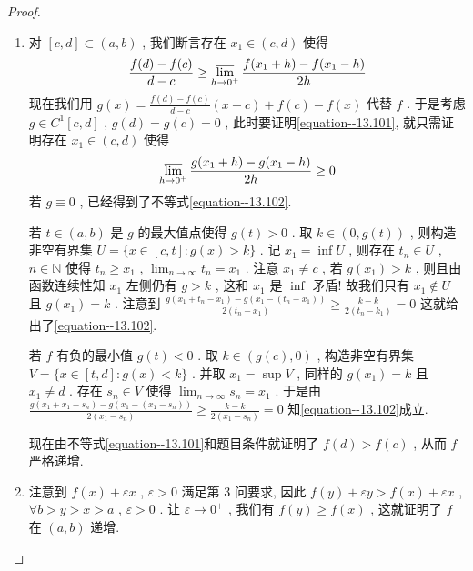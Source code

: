 \documentclass[../../main.tex]{subfiles}
\begin{document}
\begin{proof}
\begin{enumerate}
\item 对 \([c, d] \subset (a, b)\) , 我们断言存在 \(x_1 \in (c, d)\) 使得
\begin{align}
\frac{f(d) - f(c)}{d - c} \geq \varlimsup_{h \to 0^+} \frac{f(x_1 + h) - f(x_1 - h)}{2h} \label{equation--13.101}
\end{align}
现在我们用 \(g(x) = \frac{f(d) - f(c)}{d - c}(x - c) + f(c) - f(x)\) 代替 \(f\) . 于是考虑 \(g \in C^1[c, d]\) , \(g(d) = g(c) = 0\) , 此时要证明\eqref{equation--13.101}, 就只需证明存在 \(x_1 \in (c, d)\) 使得
\begin{align}
\varlimsup_{h \to 0^+} \frac{g(x_1 + h) - g(x_1 - h)}{2h} \geq 0 \label{equation--13.102}
\end{align}
若 \(g \equiv 0\) , 已经得到了不等式\eqref{equation--13.102}.

若 \(t \in (a, b)\) 是 \(g\) 的最大值点使得 \(g(t) > 0\) . 取 \(k \in (0, g(t))\) , 则构造非空有界集
\(U = \{x \in [c, t] : g(x) > k\}\) .
记 \(x_1 = \inf U\) , 则存在 \(t_n \in U\) , \(n \in \mathbb{N}\) 使得
\(t_n \geq x_1\) , \(\lim_{n \to \infty} t_n = x_1\) .
注意 \(x_1 \neq c\) , 若 \(g(x_1) > k\) , 则且由函数连续性知 \(x_1\) 左侧仍有 \(g > k\) , 这和 \(x_1\) 是 \(\inf\) 矛盾! 故我们只有 \(x_1 \notin U\) 且 \(g(x_1) = k\) . 注意到
\(\frac{g(x_1 + t_n - x_1) - g(x_1 - (t_n - x_1))}{2(t_n - x_1)} \geq \frac{k - k}{2(t_n - k_1)} = 0\)
这就给出了\eqref{equation--13.102}.

若 \(f\) 有负的最小值 \(g(t) < 0\) . 取 \(k \in (g(c), 0)\) , 构造非空有界集
\(V = \{x \in [t, d] : g(x) < k\}\) .
并取 \(x_1 = \sup V\) , 同样的 \(g(x_1) = k\) 且 \(x_1 \neq d\) . 存在 \(s_n \in V\) 使得 \(\lim_{n \to \infty} s_n = x_1\) . 于是由
\(\frac{g(x_1 + x_1 - s_n) - g(x_1 - (x_1 - s_n))}{2(x_1 - s_n)} \geq \frac{k - k}{2(x_1 - s_n)} = 0\)
知\eqref{equation--13.102}成立.

现在由不等式\eqref{equation--13.101}和题目条件就证明了 \(f(d) > f(c)\) , 从而 \(f\) 严格递增.

\item 注意到 \(f(x) + \varepsilon x\) , \(\varepsilon > 0\) 满足第 3 问要求, 因此
\(f(y) + \varepsilon y > f(x) + \varepsilon x\) , \(\forall b > y > x > a\) , \(\varepsilon > 0\) .
让 \(\varepsilon \to 0^+\) , 我们有 \(f(y) \geq f(x)\) , 这就证明了 \(f\) 在 \((a, b)\) 递增. 
\end{enumerate}
\end{proof}
\end{document}
